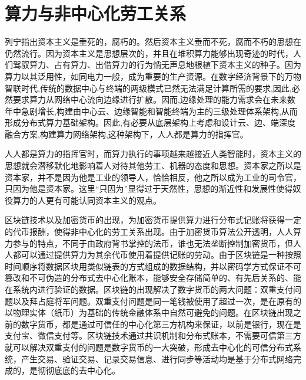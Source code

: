 \documentclass{ctexart}
\begin{document}
\section{算力与非中心化劳工关系}

列宁指出资本主义是垂死的，腐朽的。然后资本主义垂而不死，腐而不朽的思想在仍然流行。因为资本主义是思想层次的，并且在堆积算力能够出现奇迹的时代，人们驾驭算力、占有算力、出借算力的行为悄无声息地根植下资本主义的种子。因为算力以其泛用性，如同电力一般，成为重要的生产资源。在数字经济背景下的万物智联时代,传统的数据中心与终端的两级模式已然无法满足计算所需的要求,因此,必然要求算力从网络中心流向边缘进行扩散。因而,边缘处理的能力需求会在未来数年中急剧增长,构建由中心云、边缘智能和智能终端为主的三级处理体系架构,从而形成分布式算力基础架构。因此,有必要从底层架构上考虑和设计云、边、端深度融合方案,构建算力网络架构\cite{吕廷杰2021数字经济背景下的算力网络研究},这种架构下，人人都是算力的指挥官。

人人都是算力的指挥官时，而算力执行的事项越来越接近人类智能时，资本主义的思想就会潜移默化地影响着人对待其他劳工、机器的态度和思想。资本家之所以是资本家，并不是因为他是工业的领导人，恰恰相反，他之所以成为工业的司令官，只因为他是资本家。这里“只因为”显得过于天然性，思想的渐近性和发展性使得奴役算力的人更有可能认同资本主义的观点。

区块链技术以及加密货币的出现，为加密货币提供算力进行分布式记账将获得一定的代币报酬，使得非中心化的劳工关系出现。由于加密货币算法公开透明，人人算力参与的特点，不同于由政府背书掌控的法币，谁也无法垄断控制加密货币，但人人都可以通过提供算力为其余代币使用着提供记账的劳动。由于区块链是一种按照时间顺序将数据区块用类似链表的方式组成的数据结构，并以密码学方式保证不可篡改和不可伪造的分布式去中心化账本，能够安全存储简单的、有先后关系的、能在系统内进行验证的数据\cite{沈鑫2016区块链技术综述}。区块链的出现解决了数字货币的两大问题\cite{安庆文2017基于区块链的去中心化交易关键技术研究及应用}：双重支付问题以及拜占庭将军问题。双重支付问题是同一笔钱被使用了超过一次，是在原有的以物理实体（纸币）为基础的传统金融体系中自然可避免的问题。在区块链出现之前的数字货币，都是通过可信任的中心化第三方机构来保证，以前是银行，现在是支付宝、微信支付等。区块链技术通过共识机制和分布式账本，不需要可信第三方就可以解决双重支付的问题是数字货币的一大突破，形成去中心化的可信分布式系统，产生交易、验证交易、记录交易信息、进行同步等活动均是基于分布式网络完成的，是彻彻底底的去中心化。
\end{document}
